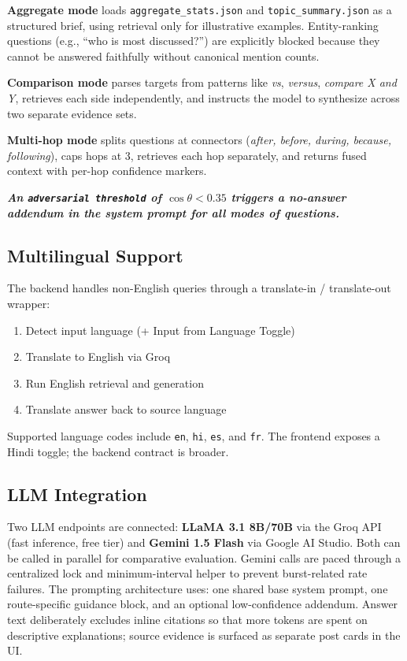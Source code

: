 \documentclass[11pt,a4paper]{article}
\begin{document}
\textbf{Aggregate mode} loads \texttt{aggregate\_stats.json} and \texttt{topic\_summary.json} as a structured brief, using retrieval only for illustrative examples. Entity-ranking questions (e.g., ``who is most discussed?'') are explicitly blocked because they cannot be answered faithfully without canonical mention counts.

\textbf{Comparison mode} parses targets from patterns like \textit{vs}, \textit{versus}, \textit{compare X and Y}, retrieves each side independently, and instructs the model to synthesize across two separate evidence sets.

\textbf{Multi-hop mode} splits questions at connectors (\textit{after, before, during, because, following}), caps hops at 3, retrieves each hop separately, and returns fused context with per-hop confidence markers.

\textbf{\textit{An \texttt{adversarial threshold} of $\cos\theta < 0.35$ triggers a no-answer addendum in the system prompt for all modes of questions.}}

\subsection{Multilingual Support}

The backend handles non-English queries through a translate-in / translate-out wrapper:

\begin{enumerate}
  \item Detect input language (+ Input from Language Toggle) 
  \item Translate to English via Groq
  \item Run English retrieval and generation
  \item Translate answer back to source language
\end{enumerate}

Supported language codes include \texttt{en}, \texttt{hi}, \texttt{es}, and \texttt{fr}. The frontend exposes a Hindi toggle; the backend contract is broader.

\subsection{LLM Integration}

Two LLM endpoints are connected: \textbf{LLaMA 3.1 8B/70B} via the Groq API (fast inference, free tier) and \textbf{Gemini 1.5 Flash} via Google AI Studio. Both can be called in parallel for comparative evaluation. Gemini calls are paced through a centralized lock and minimum-interval helper to prevent burst-related rate failures. The prompting architecture uses: one shared base system prompt, one route-specific guidance block, and an optional low-confidence addendum. Answer text deliberately excludes inline citations so that more tokens are spent on descriptive explanations; source evidence is surfaced as separate post cards in the UI.
\end{document}
